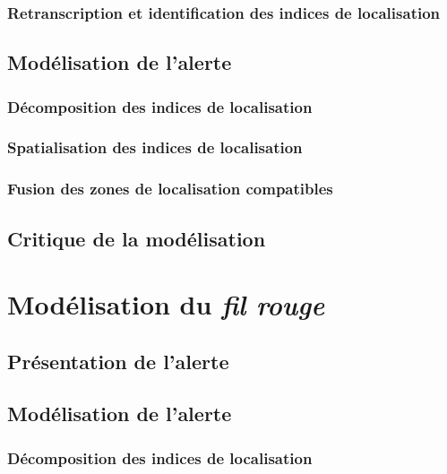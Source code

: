 \subsubsection{Retranscription et identification des indices de localisation}
\label{subsec:9-2-1-1}

\subsection{Modélisation de l'alerte}
\label{subsec:9-2-2}

\subsubsection{Décomposition des indices de localisation}
\label{subsec:9-2-2-2}

\subsubsection{Spatialisation des indices de localisation}
\label{subsec:9-2-2-3}

\subsubsection{Fusion des zones de localisation compatibles}
\label{subsec:9-2-2-4}

\subsection{Critique de la modélisation}
\label{subsec:9-2-3}




\section{Modélisation du \emph{fil rouge}}
\label{sec:9-3}

\subsection{Présentation de l'alerte}
\label{subsec:9-3-1}

\subsection{Modélisation de l'alerte}
\label{subsec:9-3-2}

\subsubsection{Décomposition des indices de localisation}
\label{subsec:9-3-2-1}

